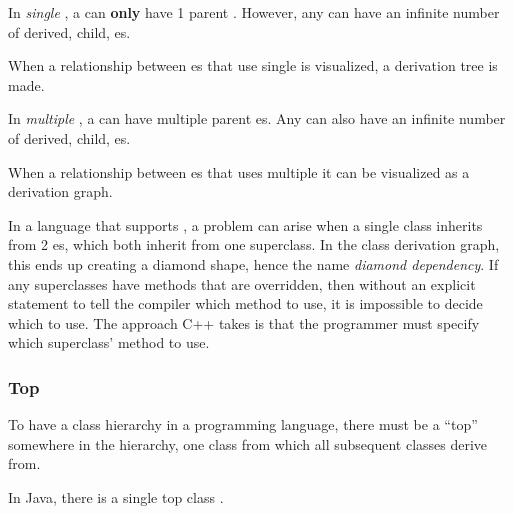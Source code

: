 \begin{definition}\label{def:OOP_Single_Inheritance}
  In \emph{single }, a  can \textbf{only} have 1 parent .
  However, any  can have an infinite number of derived, child, es.

  When a relationship between es that use single  is visualized, a derivation tree is made.
\end{definition}

\begin{definition}\label{def:OOP_Multiple_Inheritance}
  In \emph{multiple }, a  can have multiple parent es.
  Any  can also have an infinite number of derived, child, es.

  When a relationship between es that uses multiple  it can be visualized as a derivation graph.

  \begin{remark}\label{rmk:Diamond_Dependency}
    In a language that supports , a problem can arise when a single class inherits from 2 es, which both inherit from one superclass.
    In the class derivation graph, this ends up creating a diamond shape, hence the name \emph{diamond dependency}.
    If any superclasses have methods that are overridden, then without an explicit statement to tell the compiler which method to use, it is impossible to decide which to use.
    The approach C++ takes is that the programmer must specify which superclass' method to use.
  \end{remark}
\end{definition}

\subsubsection{Top }\label{subsubsec:Top_OOP_Superclass}
To have a class hierarchy in a programming language, there must be a ``top''  somewhere in the hierarchy, one class from which all subsequent classes derive from.

In Java, there is a single top class \texttt{}.

